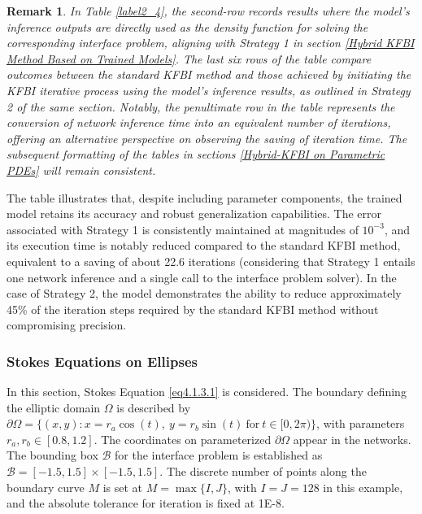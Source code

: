 \documentclass{article}
\newtheorem{remark}{Remark}
\begin{document}
\begin{remark}
In Table \ref{label2_4}, the second-row records results where the model's inference outputs are directly used as the density function for solving the corresponding interface problem, aligning with Strategy 1 in section \ref{Hybrid KFBI Method Based on Trained Models}. The last six rows of the table compare outcomes between the standard KFBI method and those achieved by initiating the KFBI iterative process using the model's inference results, as outlined in Strategy 2 of the same section. Notably, the penultimate row in the table represents the conversion of network inference time into an equivalent number of iterations, offering an alternative perspective on observing the saving of iteration time. The subsequent formatting of the tables in sections \ref{Hybrid-KFBI on Parametric PDEs} will remain consistent.
\end{remark}

The table illustrates that, despite including parameter components, the trained model retains its accuracy and robust generalization capabilities. The error associated with Strategy 1 is consistently maintained at magnitudes of $10^{-3}$, and its execution time is notably reduced compared to the standard KFBI method, equivalent to a saving of about 22.6 iterations (considering that Strategy 1 entails one network inference and a single call to the interface problem solver). In the case of Strategy 2, the model demonstrates the ability to reduce approximately 45\% of the iteration steps required by the standard KFBI method without compromising precision.

\subsubsection{Stokes Equations on Ellipses}
In this section, Stokes Equation \eqref{eq4.1.3.1} is considered. The boundary defining the elliptic domain $\Omega$ is described by $\partial \Omega = \{(x, y): x = r_a \cos(t),\ y = r_b \sin(t)\ \mbox{for}\ t \in [0, 2\pi) \}$, with parameters $r_a, r_b \in [0.8, 1.2]$. The coordinates on parameterized $\partial \Omega$ appear in the networks. The bounding box $\mathcal{B}$ for the interface problem is established as $\mathcal{B} = [-1.5,1.5] \times [-1.5,1.5]$. The discrete number of points along the boundary curve $M$ is set at $M = \max\{I, J\}$, with $I = J = 128$ in this example, and the absolute tolerance for iteration is fixed at 1E-8.
\end{document}
